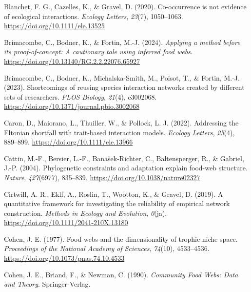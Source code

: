 \documentclass[
]{article}
\newlength{\cslhangindent}
\newenvironment{CSLReferences}[2] %
 {\begin{list}{}{%
  \setlength{\itemindent}{0pt}
  \setlength{\leftmargin}{0pt}
  \setlength{\parsep}{0pt}
  \ifodd #1
   \setlength{\leftmargin}{\cslhangindent}
   \setlength{\itemindent}{-1\cslhangindent}
  \fi
  \setlength{\itemsep}{#2\baselineskip}}}
 {\end{list}}
\begin{document}
\begin{CSLReferences}{1}{0}
Blanchet, F. G., Cazelles, K., \& Gravel, D. (2020). Co-occurrence is
not evidence of ecological interactions. \emph{Ecology Letters},
\emph{23}(7), 1050--1063. \url{https://doi.org/10.1111/ele.13525}

Brimacombe, C., Bodner, K., \& Fortin, M.-J. (2024). \emph{Applying a
method before its proof-of-concept: {A} cautionary tale using inferred
food webs}. \url{https://doi.org/10.13140/RG.2.2.22076.65927}

Brimacombe, C., Bodner, K., Michalska-Smith, M., Poisot, T., \& Fortin,
M.-J. (2023). Shortcomings of reusing species interaction networks
created by different sets of researchers. \emph{PLOS Biology},
\emph{21}(4), e3002068.
\url{https://doi.org/10.1371/journal.pbio.3002068}

Caron, D., Maiorano, L., Thuiller, W., \& Pollock, L. J. (2022).
Addressing the {Eltonian} shortfall with trait-based interaction models.
\emph{Ecology Letters}, \emph{25}(4), 889--899.
\url{https://doi.org/10.1111/ele.13966}

Cattin, M.-F., Bersier, L.-F., Banašek-Richter, C., Baltensperger, R.,
\& Gabriel, J.-P. (2004). Phylogenetic constraints and adaptation
explain food-web structure. \emph{Nature}, \emph{427}(6977), 835--839.
\url{https://doi.org/10.1038/nature02327}

Cirtwill, A. R., Eklf, A., Roslin, T., Wootton, K., \& Gravel, D.
(2019). A quantitative framework for investigating the reliability of
empirical network construction. \emph{Methods in Ecology and Evolution},
\emph{0}(ja). \url{https://doi.org/10.1111/2041-210X.13180}

Cohen, J. E. (1977). Food webs and the dimensionality of trophic niche
space. \emph{Proceedings of the National Academy of Sciences},
\emph{74}(10), 4533--4536. \url{https://doi.org/10.1073/pnas.74.10.4533}

Cohen, J. E., Briand, F., \& Newman, C. (1990). \emph{Community {Food
Webs}: {Data} and {Theory}}. Springer-Verlag.


\end{CSLReferences}
\end{document}
